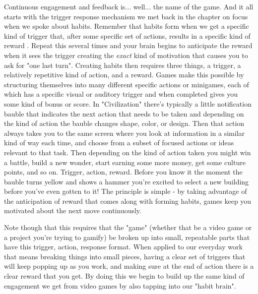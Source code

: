 \documentclass[11pt,a5paper]{book}
\begin{document}
Continuous engagement and feedback is... well... the name of the game. And it all starts with the trigger response mechanism we met back in the chapter on focus when we spoke about habits. Remember  that habits form when we get a specific kind of trigger that, after some specific set of actions, results in a specific kind of reward \cite{duhigg}. Repeat this several times and your brain begins to anticipate the reward when it sees the trigger creating the \textit{exact} kind of motivation that causes you to ask for "one last turn". Creating habits then requires three things, a trigger, a relatively repetitive kind of action, and a reward. Games make this possible by structuring themselves into many different specific actions or minigames, each of which has a specific visual or auditory trigger and when completed gives you some kind of bonus or score. In "Civilization" there's typically a little notification bauble that indicates the next action that needs to be taken and depending on the kind of action the bauble changes shape, color, or design. Then that action always takes you to the same screen where you look at information in a similar kind of way each time, and choose from a subset of focused actions or ideas relevant to that task. Then depending on the kind of action taken you might win a battle, build a new wonder, start earning some more money, get some culture points, and so on. Trigger, action, reward. Before you know it the moment the bauble turns yellow and shows a hammer you're excited to select a new building before you've even gotten to it! The principle is simple - by taking advantage of the anticipation of reward that comes along with forming habits, games keep you motivated about the next move continuously.  
\newline

Note though that this requires that the "game" (whether that be a video game or a project you're trying to gamify) be broken up into small, repeatable parts that have this trigger, action, response format. When applied to our everyday work that means breaking things into small pieces, having a clear set of triggers that will keep popping up as you work, and making sure at the end of action there is a clear reward that you get. By doing this we begin to build up the same kind of engagement we get from video games by also tapping into our "habit brain". 
\newline
\end{document}
